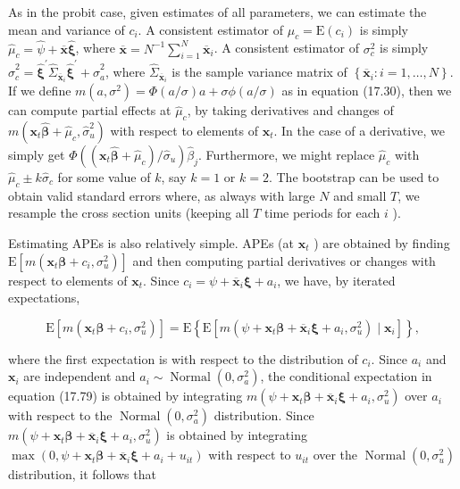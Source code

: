 \documentclass[10pt]{article}
\begin{document}
As in the probit case, given estimates of all parameters, we can estimate the mean and variance of $c_{i}$. A consistent estimator of $\mu_{c}=\mathrm{E}\left(c_{i}\right)$ is simply $\hat{\mu}_{c}=\hat{\psi}+\overline{\mathbf{x}} \hat{\boldsymbol{\xi}}$, where $\overline{\mathbf{x}}=N^{-1} \sum_{i=1}^{N} \overline{\mathbf{x}}_{i}$. A consistent estimator of $\sigma_{c}^{2}$ is simply $\hat{\sigma}_{c}^{2}=\hat{\boldsymbol{\xi}}^{\prime} \hat{\Sigma}_{\overline{\mathbf{x}}_{i}} \hat{\boldsymbol{\xi}}^{\prime}+\hat{\sigma}_{a}^{2}$, where $\hat{\Sigma}_{\overline{\mathbf{x}}_{i}}$ is the sample variance matrix of $\left\{\overline{\mathbf{x}}_{i}: i=1, \ldots, N\right\}$. If we define $m\left(a, \sigma^{2}\right)=\Phi(a / \sigma) a+ \sigma \phi(a / \sigma)$ as in equation (17.30), then we can compute partial effects at $\hat{\mu}_{c}$, by taking derivatives and changes of $m\left(\mathbf{x}_{t} \hat{\boldsymbol{\beta}}+\hat{\mu}_{c}, \hat{\sigma}_{u}^{2}\right)$ with respect to elements of $\mathbf{x}_{t}$. In the case of a derivative, we simply get $\Phi\left(\left(\mathbf{x}_{t} \hat{\boldsymbol{\beta}}+\hat{\mu}_{c}\right) / \hat{\sigma}_{u}\right) \hat{\beta}_{j}$. Furthermore, we might replace $\hat{\mu}_{c}$ with $\hat{\mu}_{c} \pm k \hat{\sigma}_{c}$ for some value of $k$, say $k=1$ or $k=2$. The bootstrap can be used to obtain valid standard errors where, as always with large $N$ and small $T$, we resample the cross section units (keeping all $T$ time periods for each $i$ ).

Estimating APEs is also relatively simple. APEs (at $\mathbf{x}_{t}$ ) are obtained by finding $\mathrm{E}\left[m\left(\mathbf{x}_{t} \boldsymbol{\beta}+c_{i}, \sigma_{u}^{2}\right)\right]$ and then computing partial derivatives or changes with respect to elements of $\mathbf{x}_{t}$. Since $c_{i}=\psi+\overline{\mathbf{x}}_{i} \boldsymbol{\xi}+a_{i}$, we have, by iterated expectations,


\begin{equation*}
\mathrm{E}\left[m\left(\mathbf{x}_{t} \boldsymbol{\beta}+c_{i}, \sigma_{u}^{2}\right)\right]=\mathrm{E}\left\{\mathrm{E}\left[m\left(\psi+\mathbf{x}_{t} \boldsymbol{\beta}+\overline{\mathbf{x}}_{i} \boldsymbol{\xi}+a_{i}, \sigma_{u}^{2}\right) \mid \mathbf{x}_{i}\right]\right\}, \tag{17.79}
\end{equation*}


where the first expectation is with respect to the distribution of $c_{i}$. Since $a_{i}$ and $\mathbf{x}_{i}$ are independent and $a_{i} \sim \operatorname{Normal}\left(0, \sigma_{a}^{2}\right)$, the conditional expectation in equation (17.79) is obtained by integrating $m\left(\psi+\mathbf{x}_{t} \boldsymbol{\beta}+\overline{\mathbf{x}}_{i} \boldsymbol{\xi}+a_{i}, \sigma_{u}^{2}\right)$ over $a_{i}$ with respect to the $\operatorname{Normal}\left(0, \sigma_{a}^{2}\right)$ distribution. Since $m\left(\psi+\mathbf{x}_{t} \boldsymbol{\beta}+\overline{\mathbf{x}}_{i} \boldsymbol{\xi}+a_{i}, \sigma_{u}^{2}\right)$ is obtained by integrating\\
$\max \left(0, \psi+\mathbf{x}_{t} \boldsymbol{\beta}+\overline{\mathbf{x}}_{i} \boldsymbol{\xi}+a_{i}+u_{i t}\right)$ with respect to $u_{i t}$ over the $\operatorname{Normal}\left(0, \sigma_{u}^{2}\right)$ distribution, it follows that
\end{document}
